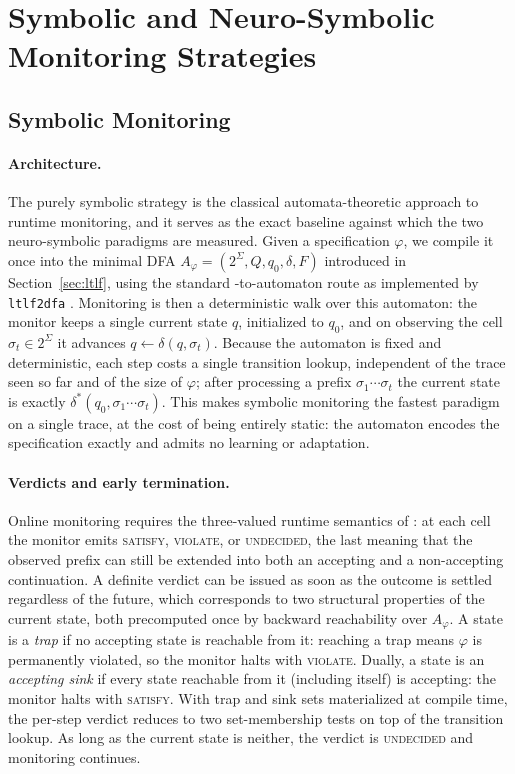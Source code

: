 \section{Symbolic and Neuro-Symbolic Monitoring Strategies}

\subsection{Symbolic Monitoring}
\label{sec:symbolic}

\paragraph{Architecture.}
The purely symbolic strategy is the classical automata-theoretic approach to runtime monitoring, and it serves as the exact baseline against which the two neuro-symbolic paradigms are measured. Given a specification $\varphi$, we compile it once into the minimal DFA $A_\varphi = (2^\Sigma, Q, q_0, \delta, F)$ introduced in Section~\ref{sec:ltlf}, using the standard \ltlf-to-automaton route \cite{LTLf,LTL2DFA1} as implemented by \texttt{ltlf2dfa} \cite{fuggitti-ltlf2dfa}. Monitoring is then a deterministic walk over this automaton: the monitor keeps a single current state $q$, initialized to $q_0$, and on observing the cell $\sigma_t \in 2^\Sigma$ it advances $q \leftarrow \delta(q, \sigma_t)$. Because the automaton is fixed and deterministic, each step costs a single transition lookup, independent of the trace seen so far and of the size of $\varphi$; after processing a prefix $\sigma_1 \cdots \sigma_t$ the current state is exactly $\delta^*(q_0, \sigma_1 \cdots \sigma_t)$. This makes symbolic monitoring the fastest paradigm on a single trace, at the cost of being entirely static: the automaton encodes the specification exactly and admits no learning or adaptation.

\paragraph{Verdicts and early termination.}
Online monitoring requires the three-valued runtime semantics of \cite{monitorability_LTL}: at each cell the monitor emits \textsc{satisfy}, \textsc{violate}, or \textsc{undecided}, the last meaning that the observed prefix can still be extended into both an accepting and a non-accepting continuation. A definite verdict can be issued as soon as the outcome is settled regardless of the future, which corresponds to two structural properties of the current state, both precomputed once by backward reachability over $A_\varphi$. A state is a \emph{trap} if no accepting state is reachable from it: reaching a trap means $\varphi$ is permanently violated, so the monitor halts with \textsc{violate}. Dually, a state is an \emph{accepting sink} if every state reachable from it (including itself) is accepting: the monitor halts with \textsc{satisfy}. With trap and sink sets materialized at compile time, the per-step verdict reduces to two set-membership tests on top of the transition lookup. As long as the current state is neither, the verdict is \textsc{undecided} and monitoring continues.

